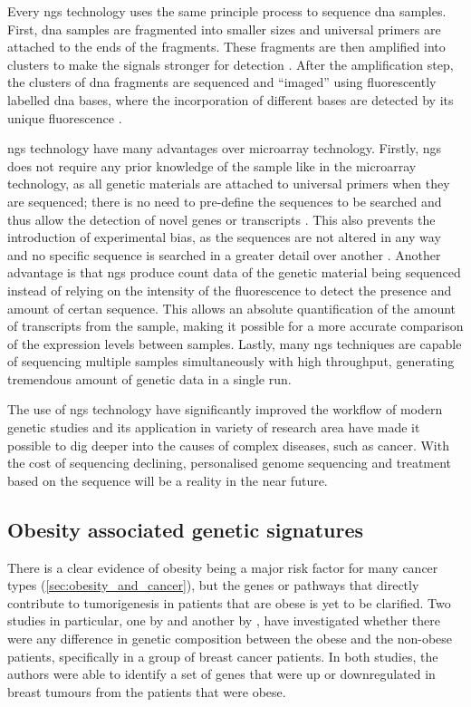 Every \gls{ngs} technology uses the same principle process to sequence \acrshort{dna} samples.
First, \acrshort{dna} samples are fragmented into smaller sizes and universal primers are attached to the ends of the fragments.
These fragments are then amplified into clusters to make the signals stronger for detection \citep{Metzker2010}.
After the amplification step, the clusters of \acrshort{dna} fragments are sequenced and ``imaged'' using fluorescently labelled \acrshort{dna} bases, where the incorporation of different bases are detected by its unique fluorescence \citep{Metzker2010}.

\gls{ngs} technology have many advantages over microarray technology.
Firstly, \gls{ngs} does not require any prior knowledge of the sample like in the microarray technology, as all genetic materials are attached to universal primers when they are sequenced; there is no need to pre-define the sequences to be searched and thus allow the detection of novel genes or transcripts \citep{Hurd2009}.
This also prevents the introduction of experimental bias, as the sequences are not altered in any way and no specific sequence is searched in a greater detail over another \citep{Hurd2009}.
Another advantage is that \gls{ngs} produce count data of the genetic material being sequenced instead of relying on the intensity of the fluorescence to detect the presence and amount of certan sequence.
This allows an absolute quantification of the amount of transcripts from the sample, making it possible for a more accurate comparison of the expression levels between samples.
Lastly, many \gls{ngs} techniques are capable of sequencing multiple samples simultaneously with high throughput, generating tremendous amount of genetic data in a single run.

The use of \gls{ngs} technology have significantly improved the workflow of modern genetic studies and its application in variety of research area have made it possible to dig deeper into the causes of complex diseases, such as cancer.
With the cost of sequencing declining, personalised genome sequencing and treatment based on the sequence will be a reality in the near future.

\subsection{Obesity associated genetic signatures}
\label{sub:obesity_associated_genetic_signatures}

There is a clear evidence of obesity being a major risk factor for many cancer types (\cref{sec:obesity_and_cancer}), but the genes or pathways that directly contribute to tumorigenesis in patients that are obese is yet to be clarified.
Two studies in particular, one by \citet{Creighton2012} and another by \citet{Fuentes-Mattei2014}, have investigated whether there were any difference in genetic composition between the obese and the non-obese patients, specifically in a group of breast cancer patients.
In both studies, the authors were able to identify a set of genes that were up or downregulated in breast tumours from the patients that were obese.

